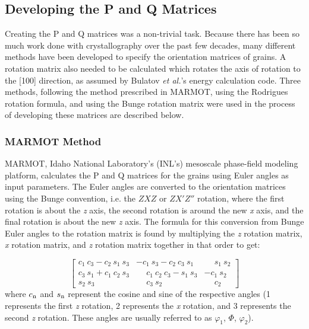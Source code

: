 \documentclass[12pt]{report}
\begin{document}
\subsection{Developing the P and Q Matrices}
Creating the P and Q matrices was a non-trivial task.  Because there has been so much work done with crystallography over the past few decades, many different methods have been developed to specify the orientation matrices of grains. A rotation matrix also needed to be calculated which rotates the axis of rotation to the [100] direction, as assumed by Bulatov \emph{et al.}'s energy calculation code.  Three methods, following the method prescribed in MARMOT, using the Rodrigues rotation formula, and using the Bunge rotation matrix were used in the process of developing these matrices are described below.

\subsubsection{MARMOT Method}
MARMOT, Idaho National Laboratory's (INL's) mesoscale phase-field modeling platform,\cite{tonks2012} calculates the P and Q matrices for the grains using Euler angles as input parameters.  The Euler angles are converted to the orientation matrices using the Bunge convention, i.e. the $ZXZ$ or $ZX'Z''$ rotation, where the first rotation is about the \emph{z} axis, the second rotation is around the new \emph{x} axis, and the final rotation is about the new \emph{z} axis.  The formula for this conversion from Bunge Euler angles to the rotation matrix is found by multiplying the \emph{z} rotation matrix, \emph{x} rotation matrix, and \emph{z} rotation matrix together in that order to get:

\begin{equation}
\label{eq:bungeMat}
\left[
\begin{array}{ccc}
c_1\ c_3 - c_2\ s_1\ s_3 & -c_1\ s_3 - c_2\ c_3\ s_1 & \phantom{-}s_1\ s_2 \\
c_3\ s_1 + c_1\ c_2\ s_3 & \phantom{-}c_1\ c_2\ c_3 - s_1\ s_3 & -c_1\ s_2 \\
s_2\ s_3 & \phantom{-}c_3\ s_2 & \phantom{-}c_2 
\end{array}
\right]
\end{equation}
where $c_\textnormal{n}$ and $s_\textnormal{n}$ represent the cosine and sine of the respective angles (1 represents the first \emph{z} rotation, 2 represents the \emph{x} rotation, and 3 represents the second \emph{z} rotation.  These angles are usually referred to as\cite{randle2000} $\varphi_1$, $\Phi$, $\varphi_2$).
\end{document}
